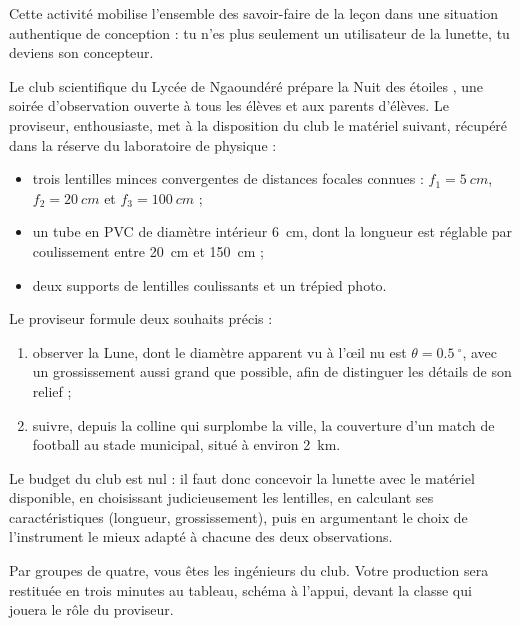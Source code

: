 \documentclass[11pt]{article}
\providecommand{\degree}{^{\circ}}
\newcommand{\cle}[1]{{\popxbold\color{popdark}#1}}
\newcounter{popsec}
\newcounter{popsub}
\newcommand{\courssub}[1]{%
  \stepcounter{popsub}%
  \par\vspace{9pt}\noindent{\popxbold\fontsize{11.5}{13}\selectfont\color{popink}{\color{poporange}\thepopsec.\thepopsub}\hspace{6pt}#1}\par\nopagebreak\vspace{4pt}
}
\begin{document}
Cette activité mobilise l'ensemble des savoir-faire de la leçon dans une situation authentique de conception : tu n'es plus seulement un utilisateur de la lunette, tu deviens son \cle{concepteur}.

\courssub{Situation}

Le club scientifique du Lycée de Ngaoundéré prépare la \og Nuit des étoiles \fg{}, une soirée d'observation ouverte à tous les élèves et aux parents d'élèves. Le proviseur, enthousiaste, met à la disposition du club le matériel suivant, récupéré dans la réserve du laboratoire de physique :

\begin{itemize}
\item trois lentilles minces convergentes de distances focales connues : $f_1 = \SI{5}{cm}$, $f_2 = \SI{20}{cm}$ et $f_3 = \SI{100}{cm}$ ;
\item un tube en PVC de diamètre intérieur \SI{6}{cm}, dont la longueur est réglable par coulissement entre \SI{20}{cm} et \SI{150}{cm} ;
\item deux supports de lentilles coulissants et un trépied photo.
\end{itemize}

Le proviseur formule deux souhaits précis :
\begin{enumerate}
\item observer la \cle{Lune}, dont le diamètre apparent vu à l'œil nu est $\theta = \SI{0,5}{\degree}$, avec un grossissement aussi grand que possible, afin de distinguer les détails de son relief ;
\item suivre, depuis la colline qui surplombe la ville, la couverture d'un match de football au stade municipal, situé à environ \SI{2}{km}.
\end{enumerate}

Le budget du club est nul : il faut donc \cle{concevoir} la lunette avec le matériel disponible, en choisissant judicieusement les lentilles, en calculant ses caractéristiques (longueur, grossissement), puis en argumentant le choix de l'instrument le mieux adapté à chacune des deux observations.

Par groupes de quatre, vous êtes les ingénieurs du club. Votre production sera restituée en trois minutes au tableau, schéma à l'appui, devant la classe qui jouera le rôle du proviseur.

\courssub{Consignes}
\end{document}
